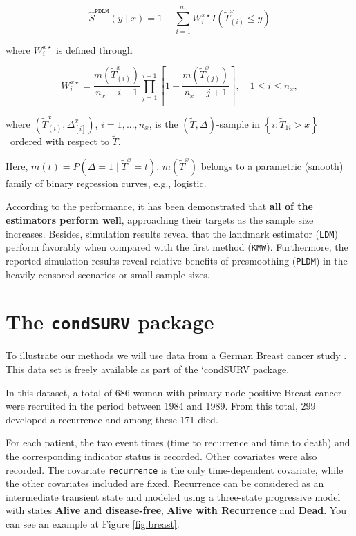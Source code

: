 \documentclass[]{book}
\theoremstyle{definition}
\theoremstyle{definition}
\theoremstyle{definition}
\theoremstyle{remark}
\begin{document}
\begin{equation*}
\widehat S^{\texttt{PDLM}}(y\mid x)=1-\sum_{i=1}^{n_x}{W_i^{x\star}I(\widetilde T_{\left(i\right)}^x \leq y)}
\end{equation*}

\noindent where \(W_{i}^{x\star}\) is defined through

\begin{equation*}
    W_{i}^{x\star}=\frac {m(\widetilde T_{\left(i\right)}^{x})}{n_x-i+1}\prod_{j=1}^{i-1}\left[1-\frac {m(\widetilde T_{\left(j\right)}^{x})}{n_x-j+1}\right], \quad 1\leq i\leq n_{x},
\end{equation*}

\noindent where
\(\left( \widetilde T_{\left( i\right) }^{x},\Delta_{\left[ i\right]}^{x}\right)\),
\(i=1,...,n_{x}\), is the \(\left( \widetilde T,\Delta\right)\)-sample
in \(\left\{i:\widetilde T_{1i}>x\right\}\)~ordered with respect to
\(\widetilde T\).

Here, \(m(t)= P(\Delta=1\mid \widetilde T^{x}=t)\).
\(m(\widetilde T^{x})\) belongs to a parametric (smooth) family of
binary regression curves, e.g., logistic.

According to the performance, it has been demonstrated that \textbf{all
of the estimators perform well}, approaching their targets as the sample
size increases. Besides, simulation results reveal that the landmark
estimator (\texttt{LDM}) perform favorably when compared with the first
method (\texttt{KMW}). Furthermore, the reported simulation results
reveal relative benefits of presmoothing (\texttt{PLDM}) in the heavily
censored scenarios or small sample sizes.

\section{\texorpdfstring{The \texttt{condSURV}
package}{The condSURV package}}\label{the-condsurv-package}

To illustrate our methods we will use data from a German Breast cancer
study \citep{book:1506027}. This data set is freely available as part of
the `condSURV package.

In this dataset, a total of 686 woman with primary node positive Breast
cancer were recruited in the period between 1984 and 1989. From this
total, 299 developed a recurrence and among these 171 died.

For each patient, the two event times (time to recurrence and time to
death) and the corresponding indicator status is recorded. Other
covariates were also recorded. The covariate \texttt{recurrence} is the
only time-dependent covariate, while the other covariates included are
fixed. Recurrence can be considered as an intermediate transient state
and modeled using a three-state progressive model with states
\textbf{Alive and disease-free}, \textbf{Alive with Recurrence} and
\textbf{Dead}. You can see an example at Figure \ref{fig:breast}.
\end{document}
